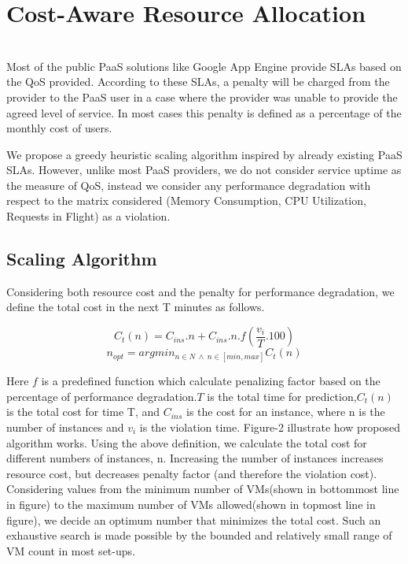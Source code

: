 \section{Cost-Aware Resource Allocation}\\
Most of the public PaaS solutions like Google App Engine provide SLAs based on the QoS provided. According to these SLAs, a penalty will be charged from the provider to the PaaS user in a case where the provider was unable to provide the agreed level of service. In most cases this penalty is defined as a percentage of the monthly cost of users.

We propose a greedy heuristic scaling algorithm inspired by already existing PaaS SLAs. However, unlike most PaaS providers, we do not consider service uptime as the measure of QoS, instead we consider any performance degradation with respect to the matrix considered (Memory Consumption, CPU Utilization, Requests in Flight) as a violation.

\subsection{Scaling Algorithm}
Considering both resource cost and the penalty for performance degradation, we define the total cost in the next T minutes as follows.

\textbf{$$ C_t(n) = C_{ins}.n  + C_{ins} . n . f(\frac{v_i}{T}.100) $$}
\textbf{$$n_{opt} = argmin_{n \in N \ \land \ n \in [min, max]}C_t(n)$$} 


Here $f$ is a predefined function which calculate penalizing factor based on the percentage of performance degradation.$T$ is the total time for prediction,$C_t(n)$ is the total cost for time T, and $C_{ins}$ is the cost for an instance, where n is the number of instances and $v_i$ is the violation time. Figure-2 illustrate how proposed algorithm works. Using the above definition, we calculate the total cost for different numbers of instances, n. Increasing the number of instances increases resource cost, but decreases penalty factor (and therefore the violation cost). Considering values from the minimum number of VMs(shown in bottommost line in figure) to the maximum number of VMs allowed(shown in topmost line in figure), we decide an optimum number that minimizes the total cost. Such an exhaustive search is made possible by the bounded and relatively small range of VM count in most set-ups.